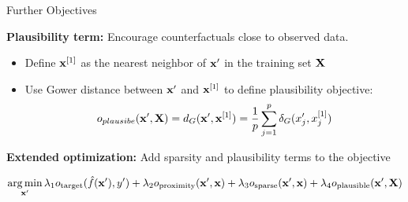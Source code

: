 \documentclass[10pt,compress,t,notes=noshow, xcolor=table]{beamer}
\begin{document}
\begin{frame}{Further Objectives}

\textbf{Plausibility term:} Encourage counterfactuals close to observed data.

\begin{itemize}
  \item Define $\mathbf{x}^{[1]}$ as the nearest neighbor of $\mathbf{x}'$ in the training set $\mathbf{X}$
  \item Use Gower distance between $\mathbf{x}'$ and $\mathbf{x}^{[1]}$ to define plausibility objective: 
$$o_{plausibe}(\mathbf{x}', \mathbf{X}) = d_G(\mathbf{x}', \mathbf{x}^{[1]}) = \frac{1}{p} \sum_{j = 1}^{p}  \delta_G(x_j', x^{[1]}_j)$$
\end{itemize}


\pause

\textbf{Extended optimization:} Add sparsity and plausibility terms to the objective

\[
\mathop{\mathrm{arg\,min}}_{\mathbf{x}'} \lambda_1 o_{\text{target}}(\hat{f}(\mathbf{x}'), y') 
+ \lambda_2 o_{\text{proximity}}(\mathbf{x}', \mathbf{x})
+ \lambda_3 o_{\text{sparse}}(\mathbf{x}', \mathbf{x}) 
+ \lambda_4 o_{\text{plausible}}(\mathbf{x}', \mathbf{X})
\]



\end{frame}
\end{document}
